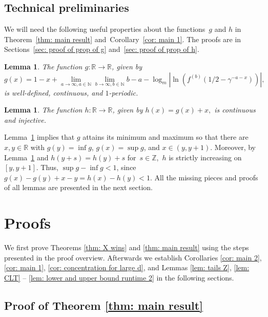 \documentclass[11pt]{article}
\numberwithin{theorem}{section}
\newtheorem{lemma}[theorem]{Lemma}
\begin{document}
\subsection{Technical preliminaries}\label{subsec: technical preliminaries}

We will need the following useful properties about the functions~$g$ and $h$ in Theorem~\ref{thm: main result} and~Corollary~\ref{cor: main 1}. The proofs are in Sections~\ref{sec: proof of prop of g} and~\ref{sec: proof of prop of h}.
\begin{lemma}\label{lem: prop of g}
    The function $g:\mathbb{R}\to \mathbb{R}$, given by
    \[
    g(x)=1-x+\lim_{a\to \infty, a\in\mathbb{N}} \lim_{b \to \infty, b\in \mathbb{N}} b-a- \log_m|\ln( f^{(b)}(1/2-\gamma^{-a-x}))|,
    \]
    is well-defined, continuous, and $1$-periodic.
\end{lemma}

\begin{lemma}\label{lem: prop of h}
    The function $h:\mathbb{R}\to \mathbb{R}$, given by
    $
    h(x) = g(x)+x,
    $
    is continuous and injective.
\end{lemma}
Lemma~\ref{lem: prop of g} implies that $g$ attains its minimum and maximum so that there are $x,y\in\mathbb{R}$ with $g(y)=\inf g$, $g(x)=\sup g$, and $x\in(y,y+1)$. Moreover, by Lemma~\ref{lem: prop of h} and $h(y+s)=h(y)+s$ for~$s\in\mathbb{Z}$,~$h$ is strictly increasing on $[y,y+1]$. Thus, $\sup g-\inf g<1$, since $g(x)-g(y)+x-y=h(x)-h(y)<1$. 
All the missing pieces and proofs of all lemmas are presented in the next section.

\section{Proofs}

We first prove Theorems \ref{thm: X wins} and \ref{thm: main result} using the steps presented in the proof overview. Afterwards we establish Corollaries \ref{cor: main 2}, \ref{cor: main 1}, \ref{cor: concentration for large d}, and Lemmas \ref{lem: tails Z}, \ref{lem: CLT} -- \ref{lem: lower and upper bound runtime 2} in the following sections.

\subsection{Proof of Theorem \ref{thm: main result}}\label{subsec: Proof main result}
\end{document}

